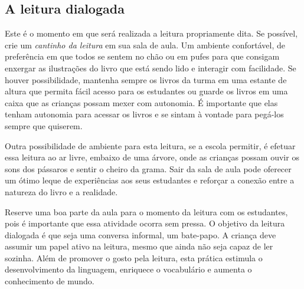 \documentclass[11pt]{extarticle}
\begin{document}
\subsection{A leitura dialogada}
Este é o momento em que será realizada a leitura propriamente dita. 
Se possível, crie um \textit{cantinho da leitura} em sua sala de aula. Um 
ambiente confortável, de preferência em que todos se sentem no chão ou 
em pufes para que consigam enxergar as ilustrações do livro que está 
sendo lido e interagir com facilidade. Se houver possibilidade, mantenha 
sempre os livros da turma em uma estante de altura que permita fácil 
acesso para os estudantes ou guarde os livros em uma caixa que as crianças 
possam mexer com autonomia. É importante que elas tenham autonomia para 
acessar os livros e se sintam à vontade para pegá-los sempre que quiserem. 



Outra possibilidade de ambiente para esta leitura, se a escola permitir, 
é efetuar essa leitura ao ar livre, embaixo de uma árvore, onde as crianças 
possam ouvir os sons dos pássaros e sentir o cheiro da grama. Sair da sala 
de aula pode oferecer um ótimo leque de experiências aos seus estudantes e 
reforçar a conexão entre a natureza do livro e a realidade.  

Reserve uma boa parte da aula para o momento da leitura com os estudantes, 
pois é importante que essa atividade ocorra sem pressa. O objetivo da 
leitura dialogada é que seja uma conversa informal, um bate-papo. A criança deve 
assumir um papel ativo na leitura, mesmo que ainda não seja capaz de 
ler sozinha. Além de promover o gosto pela leitura, esta prática estimula 
o desenvolvimento da linguagem, enriquece o vocabulário e 
aumenta o conhecimento de mundo.
\end{document}

